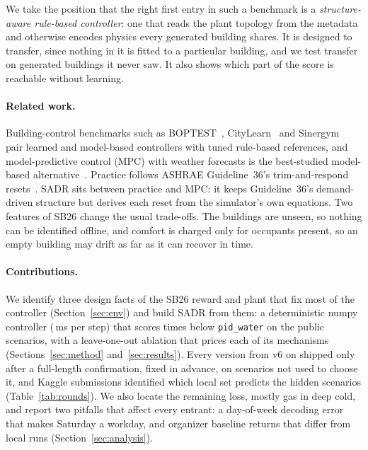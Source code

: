 \documentclass{article}
\begin{document}
We take the position that the right first entry in such a benchmark is a \emph{structure-aware rule-based controller}: one that reads the plant topology from the metadata and otherwise encodes physics every generated building shares. It is designed to transfer, since nothing in it is fitted to a particular building, and we test transfer on generated buildings it never saw. It also shows which part of the score is reachable without learning.

\paragraph{Related work.} Building-control benchmarks such as BOPTEST~\citep{blum2021boptest}, CityLearn~\citep{vazquezcanteli2019citylearn} and Sinergym~\citep{jimenezraboso2021sinergym} pair learned and model-based controllers with tuned rule-based references, and model-predictive control (MPC) with weather forecasts is the best-studied model-based alternative~\citep{oldewurtel2012mpc,drgona2020mpc}. Practice follows ASHRAE Guideline~36's trim-and-respond resets~\citep{ashrae2021g36,taylor2018vav}. SADR sits between practice and MPC: it keeps Guideline~36's demand-driven structure but derives each reset from the simulator's own equations. Two features of SB26 change the usual trade-offs. The buildings are unseen, so nothing can be identified offline, and comfort is charged only for occupants present, so an empty building may drift as far as it can recover in time.

\paragraph{Contributions.} We identify three design facts of the SB26 reward and plant that fix most of the controller (Section~\ref{sec:env}) and build SADR from them: a deterministic numpy controller (\PolicyMsOurs{}\,ms per step) that scores \RElvPwTimes{} times below \texttt{pid\_water} on the public scenarios, with a leave-one-out ablation that prices each of its mechanisms (Sections~\ref{sec:method} and~\ref{sec:results}). Every version from v6 on shipped only after a full-length confirmation, fixed in advance, on scenarios not used to choose it, and Kaggle submissions identified which local set predicts the hidden scenarios (Table~\ref{tab:rounds}). We also locate the remaining loss, mostly gas in deep cold, and report two pitfalls that affect every entrant: a day-of-week decoding error that makes Saturday a workday, and organizer baseline returns that differ from local runs (Section~\ref{sec:analysis}).
\end{document}
